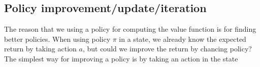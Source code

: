 \documentclass[11pt]{article}
\begin{document}
\subsection{Policy improvement/update/iteration}

The reason that we using a policy for computing the value function is for finding better policies. When using policy $\pi$ in a state, we already know the expected return by taking action $a$, but could we improve the return by chancing policy? The simplest way for improving a policy is by taking an action in the state

%
%
\end{document}

